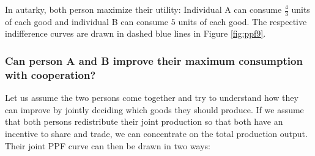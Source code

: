 {In autarky, both person maximize their utility: Individual A can consume $\frac{4}{3}$ units of each good and individual B can consume $5$ units of each good. The respective indifference curves are drawn in dashed blue lines in Figure \ref{fig:ppf9}.
	
	\pbn

	
	
	
	\subsubsection{Can person A and B improve their maximum consumption with cooperation?}
	Let us assume the two persons come together and try to understand how they can improve by jointly deciding which goods they should produce. If we assume that both persons redistribute their joint production so that both have an incentive to share and trade, we can concentrate on the total production output. Their joint PPF curve can then be drawn in two ways: 
	
}
